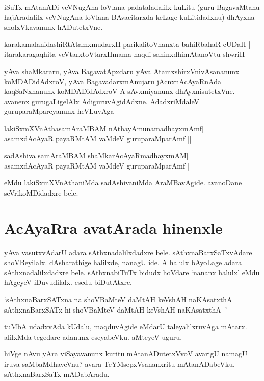 iSuTx mAtanADi veVNugAna loVlana padataladalilx kuLitu (guru BagavaMtanu hajAradalilx veVNugAna loVlana BAvacitarxda keLage kuLitidadxnu) dhAyxna sholxVkavanunx hADutetxVne.

\begin{shloka}
karakamalanidashiRtAtamxmudarxH parikalitoVnanxta bahiRbahaR cUDaH |\label{48}\\%
itarakaragaqhita veVtarxtoVtarxHmama haqdi saninxdhimAtanoVtu shwriH ||
\end{shloka}

yAva shaMkararu, yAva BagavatApxdaru yAva AtamxshirxVnivAsananunx koMDADidAdxroV, yAva BagavadarxmAnujaru jAcnxnAcAyaRnAda kaqSaNxnanunx koMDADidAdxroV A sAvxmiyanunx dhAyxnisutetxVne. avanenx gurugaLigelAlx AdiguruvAgidAdxne. AdadxriMdaleV guruparaMpareyanunx heVLuvAga-

\begin{shloka}
lakiSxmXVnAthasamAraMBAM nAthayAmunamadhayxmAmf|\label{48b}\\
asamxdAcAyaR payaRMtAM vaMdeV guruparaMparAmf ||
\end{shloka}

\begin{shloka}
sadAshiva samAraMBAM shaMkarAcAyaRmadhayxmAM|\label{48c}\\
asamxdAcAyaR payaRMtAM vaMdeV guruparaMparAmf |
\end{shloka}
eMdu lakiSxmXVnAthaniMda sadAshivaniMda AraMBavAgide. avanoDane seVrikoMDidadxre bele.

\section*{AcAyaRra avatArada hinenxle}

yAva vasutxvAdarU adara sAthxnadalilxdadxre bele. sAthxnaBarxSaTxvAdare shoVBeyilalx. dAsharathige halilxde, nanagU ide. A halulx bAyoLage adara sAthxnadalilxdadxre bele. sAthxnabiTuTx bidudx hoVdare `nananx halulx' eMdu hAgeyeV iDuvudilalx. esedu biDutAtxre.

\begin{shloka}
`sAthxnaBarxSATxna na shoVBaMteV daMtAH keVshAH naKAsatxthA|\label{48d}\\
sAthxnaBarxSATx hi shoVBaMteV daMtAH keVshAH naKAsatxthA||'
\end{shloka}

tuMbA udadxvAda kUdalu, maqduvAgide eMdarU taleyalilxruvAga mAtarx. alilxMda tegedare adanunx eseyabeVku. aMteyeV uguru.

hiVge nAvu yAra viSayavanunx kuritu mAtanADutetxVvoV avarigU namagU iruva saMbaMdhaveVnu? avara TeYMsepxVsananxritu mAtanADabeVku. sAthxnaBarxSaTx mADabAradu.


